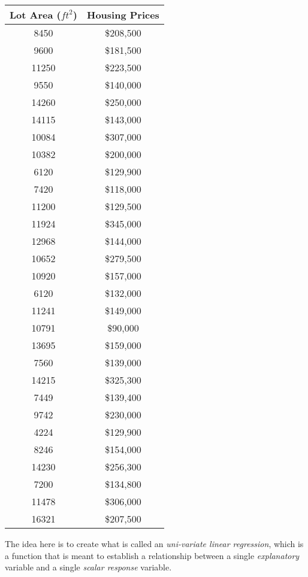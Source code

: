 \documentclass{book}[a5paper]
\begin{document}
\begin{table}
    \label{table:house_price}
    \centering
    \begin{tabular}{c|c}
        Lot Area (${ft}^2$) & Housing Prices \\
        \hline
        8450 & \$208,500 \\
        9600 & \$181,500 \\
        11250 & \$223,500 \\
        9550 & \$140,000 \\
        14260 & \$250,000 \\
        14115 & \$143,000 \\
        10084 & \$307,000 \\
        10382 & \$200,000 \\
        6120 & \$129,900 \\
        7420 & \$118,000 \\
        11200 & \$129,500 \\
        11924 & \$345,000 \\
        12968 & \$144,000 \\
        10652 & \$279,500 \\
        10920 & \$157,000 \\
        6120 & \$132,000 \\
        11241 & \$149,000 \\
        10791 & \$90,000 \\
        13695 & \$159,000 \\
        7560 & \$139,000 \\
        14215 & \$325,300 \\
        7449 & \$139,400 \\
        9742 & \$230,000 \\
        4224 & \$129,900 \\
        8246 & \$154,000 \\
        14230 & \$256,300 \\
        7200 & \$134,800 \\
        11478 & \$306,000 \\
        16321 & \$207,500 \\
    \end{tabular}
\end{table}

The idea here is to create what is called an \emph{uni-variate linear
regression}, which is a function that is meant to establish a relationship
between a single \emph{explanatory} variable and a single
\emph{scalar response} variable.  
\end{document}

